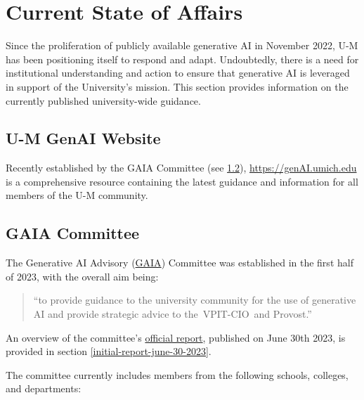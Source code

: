 \documentclass[
]{book}
\begin{document}
\hypertarget{current-state-of-affairs}{%
\chapter{Current State of Affairs}\label{current-state-of-affairs}}

Since the proliferation of publicly available generative AI in November 2022, U-M has been positioning itself to respond and adapt. Undoubtedly, there is a need for institutional understanding and action to ensure that generative AI is leveraged in support of the University's mission. This section provides information on the currently published university-wide guidance.

\hypertarget{u-m-genai-website}{%
\section{U-M GenAI Website}\label{u-m-genai-website}}

Recently established by the GAIA Committee (see \ref{gaia-committee}), \url{https://genAI.umich.edu} is a comprehensive resource containing the latest guidance and information for all members of the U-M community.

\hypertarget{gaia-committee}{%
\section{GAIA Committee}\label{gaia-committee}}

The Generative AI Advisory (\href{https://it.umich.edu/strategy-planning/gaia}{GAIA}) Committee was established in the first half of 2023, with the overall aim being:

\begin{quote}
``to provide guidance to the university community for the use of generative AI and provide strategic advice to the~VPIT-CIO~and Provost.''
\end{quote}

An overview of the committee's \href{https://genai.umich.edu/committee-report}{official report}, published on June 30th 2023, is provided in section \ref{initial-report-june-30-2023}.

The committee currently includes members from the following schools, colleges, and departments:
\end{document}
